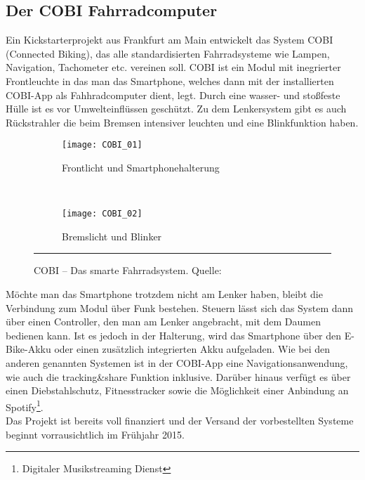 \subsection{Der COBI Fahrradcomputer}
Ein Kickstarterprojekt aus Frankfurt am Main entwickelt das System \textsc{COBI} (Connected Biking), das alle standardisierten Fahrradsysteme wie Lampen, Navigation, Tachometer etc. vereinen soll. \textsc{COBI} ist ein Modul mit inegrierter Frontleuchte in das man das \gls{Smartphone}, welches dann mit der installierten \textsc{COBI}-\Gls{App} als Fahhradcomputer dient, legt. Durch eine wasser- und stoßfeste Hülle ist es vor Umwelteinflüssen geschützt. Zu dem Lenkersystem gibt es auch Rückstrahler die beim Bremsen intensiver leuchten und eine Blinkfunktion haben.
\begin{figure}[H]
        \centering
        \begin{subfigure}[b]{0.49\textwidth}
                \texttt{[image: COBI\_01]}
                \caption{Frontlicht und Smartphonehalterung}
                \label{fig:cobi1}
        \end{subfigure}%
        ~ %
        \begin{subfigure}[b]{0.49\textwidth}
                \texttt{[image: COBI\_02]}
                \caption{Bremslicht und Blinker}
                \label{fig:cobi2}
        \end{subfigure}
        \rule{35em}{0.5pt}
        \caption[COBI]{COBI -- Das smarte Fahrradsystem. Quelle: \cite{cobi_pic}}
        \label{fig:cobi}
\end{figure}
Möchte man das \gls{Smartphone} trotzdem nicht am Lenker haben, bleibt die Verbindung zum Modul über Funk bestehen. Steuern lässt sich das System dann über einen Controller, den man am Lenker angebracht, mit dem Daumen bedienen kann. Ist es jedoch in der Halterung, wird das \gls{Smartphone} über den E-Bike-Akku oder einen zusätzlich integrierten Akku aufgeladen. Wie bei den anderen genannten Systemen ist in der \textsc{COBI}-\Gls{App} eine Navigationsanwendung, wie auch die tracking\&share Funktion inklusive. Darüber hinaus verfügt es über einen Diebstahlschutz, Fitnesstracker sowie die Möglichkeit einer Anbindung an Spotify\footnote{ Digitaler Musikstreaming Dienst}.\\
Das Projekt ist bereits voll finanziert und der Versand der vorbestellten Systeme beginnt vorrausichtlich im Frühjahr 2015\cite{cobi}.

